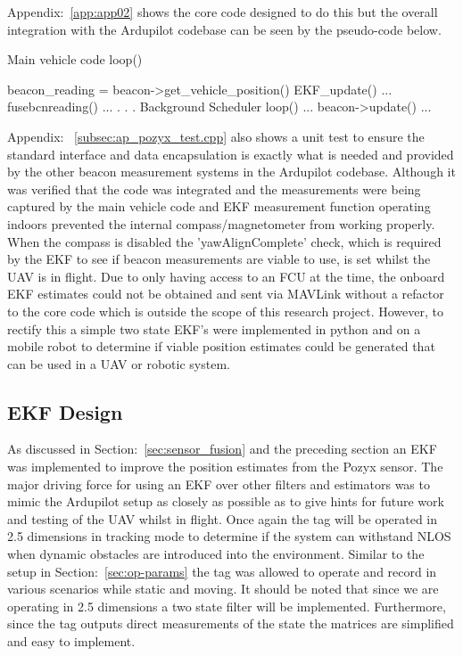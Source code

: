 Appendix:~\ref{app:app02} shows the core code designed to do this but the overall integration with the Ardupilot codebase can be seen by the pseudo-code below.
\begin{algorithm}
    Main vehicle code
        loop()
        {
            beacon_reading = beacon->get_vehicle_position()
            EKF_update()
            {
                ...
                fusebcnreading()
                ...
            }
            .
            .
            .
    Background Scheduler
        loop()
        {
            ...
            beacon->update()
            ...
        }

        }
\end{algorithm}

Appendix: ~\ref{subsec:ap_pozyx_test.cpp} also shows a unit test to ensure the standard interface and data encapsulation is exactly what is needed and provided by the other beacon measurement systems in the Ardupilot codebase.
Although it was verified that the code was integrated and the measurements were being captured by the main vehicle code and EKF measurement function operating indoors prevented the internal compass/magnetometer from working properly.
When the compass is disabled the 'yawAlignComplete' check, which is required by the EKF to see if beacon measurements are viable to use, is set whilst the UAV is in flight.
Due to only having access to an FCU at the time, the onboard EKF estimates could not be obtained and sent via MAVLink without a refactor to the core code which is outside the scope of this research project.
However, to rectify this a simple two state EKF's were implemented in python and on a mobile robot to determine if viable position estimates could be generated that can be used in a UAV or robotic system.

\subsection*{EKF Design}
As discussed in Section:~\ref{sec:sensor_fusion} and the preceding section an EKF was implemented to improve the position estimates from the Pozyx sensor.
The major driving force for using an EKF over other filters and estimators was to mimic the Ardupilot setup as closely as possible as to give hints for future work and testing of the UAV whilst in flight.
Once again the tag will be operated in 2.5 dimensions in tracking mode to determine if the system can withstand NLOS when dynamic obstacles are introduced into the environment.
Similar to the setup in Section:~\ref{sec:op-params} the tag was allowed to operate and record in various scenarios while static and moving.
It should be noted that since we are operating in 2.5 dimensions a two state filter will be implemented.
Furthermore, since the tag outputs direct measurements of the state the matrices are simplified and easy to implement.

